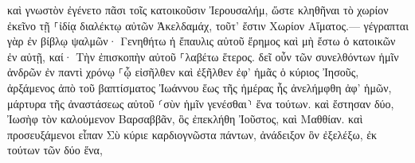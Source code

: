 \documentclass{openreader}
\begin{document}
καὶ γνωστὸν ἐγένετο πᾶσι τοῖς κατοικοῦσιν Ἰερουσαλήμ, ὥστε κληθῆναι τὸ χωρίον ἐκεῖνο τῇ ⸀ἰδίᾳ διαλέκτῳ αὐτῶν Ἁκελδαμάχ, τοῦτ’ ἔστιν Χωρίον Αἵματος.— 
γέγραπται γὰρ ἐν βίβλῳ ψαλμῶν· Γενηθήτω ἡ ἔπαυλις αὐτοῦ ἔρημος καὶ μὴ ἔστω ὁ κατοικῶν ἐν αὐτῇ, καί· Τὴν ἐπισκοπὴν αὐτοῦ ⸀λαβέτω ἕτερος. 
δεῖ οὖν τῶν συνελθόντων ἡμῖν ἀνδρῶν ἐν παντὶ χρόνῳ ⸀ᾧ εἰσῆλθεν καὶ ἐξῆλθεν ἐφ’ ἡμᾶς ὁ κύριος Ἰησοῦς, 
ἀρξάμενος ἀπὸ τοῦ βαπτίσματος Ἰωάννου ἕως τῆς ἡμέρας ἧς ἀνελήμφθη ἀφ’ ἡμῶν, μάρτυρα τῆς ἀναστάσεως αὐτοῦ ⸂σὺν ἡμῖν γενέσθαι⸃ ἕνα τούτων. 
καὶ ἔστησαν δύο, Ἰωσὴφ τὸν καλούμενον Βαρσαββᾶν, ὃς ἐπεκλήθη Ἰοῦστος, καὶ Μαθθίαν. 
καὶ προσευξάμενοι εἶπαν Σὺ κύριε καρδιογνῶστα πάντων, ἀνάδειξον ὃν ἐξελέξω, ἐκ τούτων τῶν δύο ἕνα, 
\end{document}

